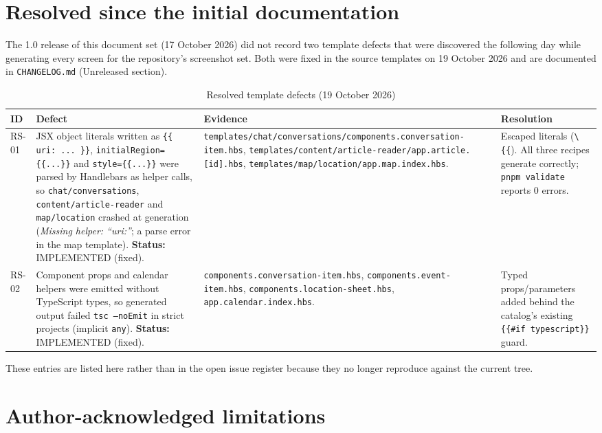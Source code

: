 \section{Resolved since the initial documentation}

The 1.0 release of this document set (17 October 2026) did not record two
template defects that were discovered the following day while generating every
screen for the repository's screenshot set. Both were fixed in the source
templates on 19 October 2026 and are documented in \texttt{CHANGELOG.md}
(Unreleased section).

\begin{longtable}{p{1.6cm}p{4.6cm}p{4.4cm}p{3.4cm}}
\caption{Resolved template defects (19 October 2026)}\\
\toprule
\textbf{ID} & \textbf{Defect} & \textbf{Evidence} & \textbf{Resolution} \\
\midrule

RS-01 & JSX object literals written as \texttt{\{\{ uri: ... \}\}},
\texttt{initialRegion=\{\{...\}\}} and \texttt{style=\{\{...\}\}} were parsed by
Handlebars as helper calls, so \texttt{chat/conversations},
\texttt{content/article-reader} and \texttt{map/location} crashed at generation
(\emph{Missing helper: ``uri:''}; a parse error in the map template).
\textbf{Status:} IMPLEMENTED (fixed). &
\texttt{templates/chat/conversations/components.conversation-item.hbs},
\texttt{templates/content/article-reader/app.article.[id].hbs},
\texttt{templates/map/location/app.map.index.hbs}. &
Escaped literals (\texttt{\textbackslash\{\{}). All three recipes generate correctly;
\texttt{pnpm validate} reports 0 errors. \\
RS-02 & Component props and calendar helpers were emitted without TypeScript
types, so generated output failed \texttt{tsc --noEmit} in strict projects
(implicit \texttt{any}).
\textbf{Status:} IMPLEMENTED (fixed). &
\texttt{components.conversation-item.hbs}, \texttt{components.event-item.hbs},
\texttt{components.location-sheet.hbs}, \texttt{app.calendar.index.hbs}. &
Typed props/parameters added behind the catalog's existing
\texttt{\{\{#if typescript\}\}} guard. \\
\bottomrule
\end{longtable}

These entries are listed here rather than in the open issue register because
they no longer reproduce against the current tree.

\section{Author-acknowledged limitations}

